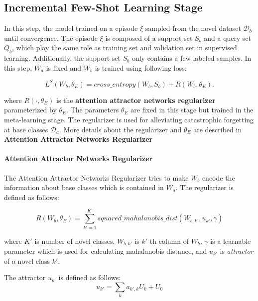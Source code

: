 \documentclass[10pt,twocolumn,letterpaper]{article}
\newcommand{\Da}{\mathcal{D}_a}
\newcommand{\Db}{\mathcal{D}_b}
\newcommand{\Qb}{Q_b}
\newcommand{\Sb}{S_b}
\newcommand{\Wa}{W_a}
\newcommand{\Wb}{W_b}
\begin{document}
\subsection{Incremental Few-Shot Learning Stage}\label{fewshot}

In this step, the model trained on a episode $\xi$ sampled from the novel dataset $\Db$ until convergence. The episode $\xi$ is composed of a support set $\Sb$ and a query set $\Qb$, which play the same role as training set and validation set in supervised learning. Additionally, the support set $\Sb$ only contains a few labeled samples. In this step, $\Wa$ is fixed and $\Wb$ is trained using following loss:

\begin{equation}
\label{eq:general_form}
L^{S}(\Wb, \theta_{E}) = cross\_entropy(\Wb, \Sb) + R(W_b,\theta_E).
\end{equation}

where $R(\cdot, \theta_E)$ is the \textbf{attention attractor networks regularizer} parameterized by $ \theta_E $. The parameters $\theta_{E}$ are fixed in this stage but trained in the meta-learning stage. The regularizer is used for alleviating catastrophic forgetting at base classes $\Da$. More details about the regularizer and $\theta_{E}$ are described in \textbf{Attention Attractor Networks Regularizer}

\paragraph{Attention Attractor Networks Regularizer}\label{atnr}
The Attention Attractor Networks Regularizer tries to make $\Wb$ encode the information about base classes which is contained in $\Wa$. The regularizer is defined as follows:

\begin{equation}
R(W_b,\theta_E) = \sum_{k'=1}^{K’} squared\_mahalanobis\_dist (W_{b, k’}, u_{k’}, \gamma)
\end{equation}

where $K'$ is number of novel classes, $W_{b, k'}$ is $k'$-th column of $\Wb$, $\gamma$ is a learnable parameter which is used for calculating mahalanobis distance, and $u_{k'}$ is \textit{attractor} of a novel class $k'$.

The attractor $u_{k'}$ is defined as follows:
\begin{equation}
u_{k'} = \sum_{k} a_{k', k}U_k + U_0
\end{equation}
\end{document}
